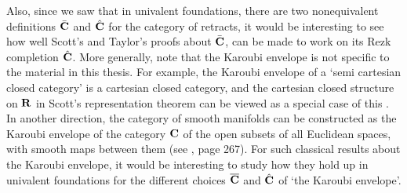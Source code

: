 Also, since we saw that in univalent foundations, there are two nonequivalent definitions $ \bar {\mathbf{C}} $ and $ \hat {\mathbf{C}} $ for the category of retracts, it would be interesting to see how well Scott's and Taylor's proofs about $ \bar {\mathbf{C}} $, can be made to work on its Rezk completion $ \hat {\mathbf{C}} $. More generally, note that the Karoubi envelope is not specific to the material in this thesis.
For example, the Karoubi envelope of a `semi cartesian closed category' is a cartesian closed category, and the cartesian closed structure on $ \mathbf{R} $ in Scott's representation theorem can be viewed as a special case of this \autocite{hayashi-1985-semifunctors}. In another direction, the category of smooth manifolds can be constructed as the Karoubi envelope of the category $ \mathbf{C} $ of the open subsets of all Euclidean spaces, with smooth maps between them (see \autocite{Lawvere-Karoubi}, page 267). For such classical results about the Karoubi envelope, it would be interesting to study how they hold up in univalent foundations for the different choices $ \overline {\mathbf{C}} $ and $ \hat {\mathbf{C}} $ of `the Karoubi envelope'.
